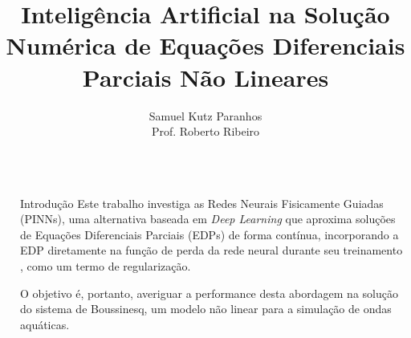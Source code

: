 \documentclass[final]{beamer}
\title{Inteligência Artificial na Solução Numérica de Equações Diferenciais Parciais Não Lineares}
\author{Samuel Kutz Paranhos \\[1ex] Prof. Roberto Ribeiro \\[4ex]}
\institute{\normalsize PIBIC 2024}
\newlength{\sepwidth}
\newlength{\colwidth}
\newcommand{\separatorcolumn}{\begin{column}{\sepwidth}\end{column}}
\begin{document}
\begin{frame}[t]
\begin{columns}[t]
\separatorcolumn

\begin{column}{\colwidth}

  \begin{block}{Introdução}
    Este trabalho investiga as \textcolor{UniBlue}{Redes Neurais Fisicamente Guiadas (PINNs)}, uma alternativa baseada em \textit{Deep Learning} que aproxima soluções de Equações Diferenciais Parciais (EDPs) de forma contínua, incorporando a EDP diretamente na função de perda da rede neural durante seu treinamento \cite{raissi2017}, como um termo de regularização.

    O objetivo é, portanto, averiguar a performance desta abordagem na solução do sistema de Boussinesq, um modelo não linear para a simulação de ondas aquáticas.
  \end{block}


\end{column}
\end{columns}
\end{frame}
\end{document}
